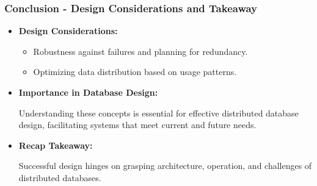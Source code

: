 \documentclass[aspectratio=169]{beamer}
\begin{document}
\begin{frame}[fragile]
  \frametitle{Conclusion - Design Considerations and Takeaway}

  \begin{itemize}
    \item \textbf{Design Considerations:}
    \begin{itemize}
      \item Robustness against failures and planning for redundancy.
      \item Optimizing data distribution based on usage patterns.
    \end{itemize}

    \item \textbf{Importance in Database Design:}
    \begin{itemize}
      Understanding these concepts is essential for effective distributed database design, facilitating systems that meet current and future needs.
    \end{itemize}

    \item \textbf{Recap Takeaway:} 
    \begin{itemize}
      Successful design hinges on grasping architecture, operation, and challenges of distributed databases.
    \end{itemize}
  \end{itemize}
\end{frame}
\end{document}
